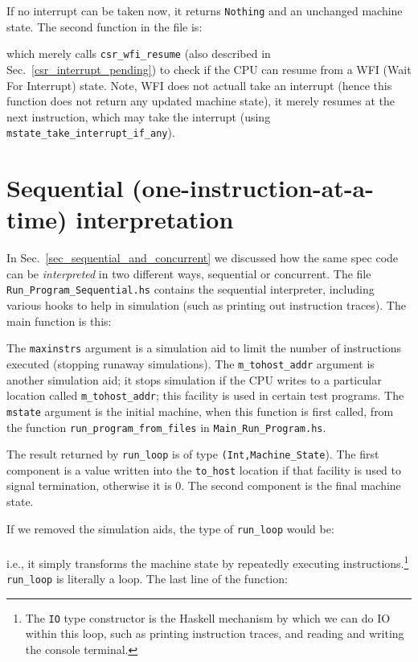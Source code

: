 \documentclass[11pt]{article}
\newcommand{\hmmm}{\hspace*{3em}}
\begin{document}
If no interrupt can be taken now, it returns \verb|Nothing| and an
unchanged machine state.  The second function in the file is:



which merely calls \verb|csr_wfi_resume| (also described in
Sec.~\ref{csr_interrupt_pending}) to check if the CPU can resume from
a WFI (Wait For Interrupt) state.  Note, WFI does not actuall take an
interrupt (hence this function does not return any updated machine
state), it merely resumes at the next instruction, which may take the
interrupt (using \verb|mstate_take_interrupt_if_any|).


\section{Sequential (one-instruction-at-a-time)  interpretation}

In Sec.~\ref{sec_sequential_and_concurrent} we discussed how the same
spec code can be \emph{interpreted} in two different ways, sequential
or concurrent.  The file \verb|Run_Program_Sequential.hs| contains the
sequential interpreter, including various hooks to help in simulation
(such as printing out instruction traces).  The main function is this:



The \verb|maxinstrs| argument is a simulation aid to limit the number
of instructions executed (stopping runaway simulations).  The
\verb|m_tohost_addr| argument is another simulation aid; it stops
simulation if the CPU writes to a particular location called
\verb|m_tohost_addr|; this facility is used in certain test programs.
The \verb|mstate| argument is the initial machine, when this function
is first called, from the function \verb|run_program_from_files| in
\verb|Main_Run_Program.hs|.

The result returned by \verb|run_loop| is of type
\verb|(Int,Machine_State|).  The first component is a value written
into the \verb|to_host| location if that facility is used to signal
termination, otherwise it is 0.  The second component is the final
machine state.

If we removed the simulation aids, the type of \verb|run_loop| would
be: \\
\hmmm {\tt Machine\_State -> IO Machine\_State} \\
i.e., it simply transforms the machine state by repeatedly executing
instructions.\footnote{ The {\tt IO} type constructor is the Haskell
mechanism by which we can do IO within this loop, such as printing
instruction traces, and reading and writing the console terminal.}
\verb|run_loop| is literally a loop.  The last line of the function:
\end{document}
